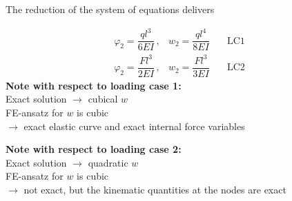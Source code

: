 The reduction of the system of equations delivers

\begin{eqnarray}
\varphi_2 = \dfrac{ql^3}{6EI} \, , & w_2 = \dfrac{ql^4}{8EI} & \quad
\mbox{LC1} \\ 
\varphi_2 = \dfrac{Fl^3}{2EI} \, , & w_2 = \dfrac{Fl^3}{3EI} & \quad
\mbox{LC2}
\end{eqnarray}
{\bf Note with respect to loading case 1:} \\
Exact solution $\rightarrow$ cubical $w$ \\
FE-ansatz for $w$ is cubic \\
$\rightarrow$ exact elastic curve and exact internal force variables

{\bf Note with respect to loading case 2:} \\
Exact solution $\rightarrow$ quadratic $w$ \\
FE-ansatz for $w$ is cubic \\
$\rightarrow$ not exact, but the kinematic quantities 
at the nodes are exact


